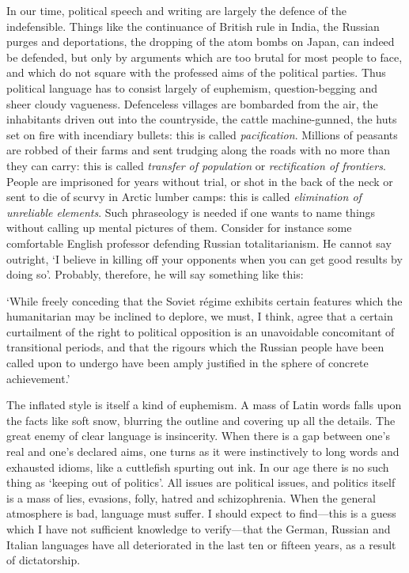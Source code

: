 
In our time, political speech and writing are largely the defence of
the in\-de\-fen\-si\-ble. Things like the continuance of British rule
in India, the Russian purges and deportations, the dropping of the
atom bombs on Japan, can indeed be defended, but only by arguments
which are too brutal for most people to face, and which do not square
with the professed aims of the political parties. Thus political
language has to consist largely of euphemism, question-begging and
sheer cloudy vagueness. Defenceless villages are bombarded from the
air, the inhabitants driven out into the countryside, the cattle
machine-gunned, the huts set on fire with incendiary bullets: this is
called \textit{pacification}. Millions of peasants are robbed of their
farms and sent trudging along the roads with no more than they can
carry: this is called \textit{transfer of population} or
\textit{rectification of frontiers}. People are imprisoned for years
without trial, or shot in the back of the neck or sent to die of
scurvy in Arctic lumber camps: this is called \textit{elimination of
unreliable elements}. Such phraseology is needed if one wants to name
things without  calling up mental pictures of them. Consider
for instance some comfortable English professor defending Russian
totalitarianism. He cannot say outright, `I believe in killing off
your opponents when you can get good results by doing so'. Probably,
therefore, he will say something like this:

`While freely conceding that the Soviet r\'egime exhibits certain
features which the humanitarian may be inclined to deplore, we must, I
think, agree that a certain curtailment of the right to political
opposition is an unavoidable concomitant of transitional periods, and
that the rigours which the Russian people have been called upon to
undergo have been amply justified in the sphere of concrete
achievement.'

The inflated style is itself a kind of euphemism. A mass of Latin
words falls upon the facts like soft snow, blurring the outline and
covering up all the details. The great enemy of clear language is
insincerity. When there is a gap between one's real and one's declared
aims, one turns as it were instinctively to long words and exhausted
idioms, like a cuttlefish spurting out ink. In our age there is no
such thing as `keeping out of politics'. All issues are political
issues, and politics itself is a mass of lies, evasions, folly, hatred
and schizophrenia. When the general atmosphere is bad, language must
suffer. I should expect to find---this is a guess which I have not
sufficient knowledge to verify---that the German, Russian and Italian
languages have all deteriorated in the last ten or fifteen years, as a
result of dictatorship.

